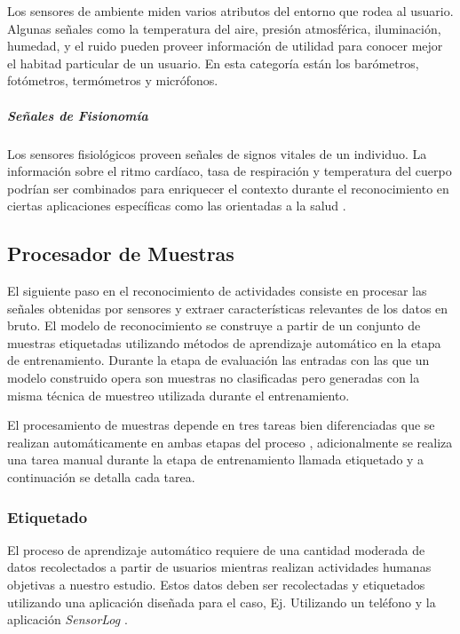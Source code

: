 Los sensores de ambiente miden varios atributos del entorno que rodea
al usuario. Algunas señales como la temperatura del aire, presión
atmosférica, iluminación, humedad, y el ruido pueden proveer información
de utilidad para conocer mejor el habitad particular de un usuario.
En esta categoría están los barómetros, fotómetros, termómetros y
micrófonos.

\subparagraph{Señales de Fisionomía}

Los sensores fisiológicos proveen señales de signos vitales de un
individuo. La información sobre el ritmo cardíaco, tasa de respiración
y temperatura del cuerpo podrían ser combinados para enriquecer el
contexto durante el reconocimiento en ciertas aplicaciones específicas
como las orientadas a la salud \cite{LaraLabrador2013}.

\subsection{Procesador de Muestras}

\label{sec44:proceso-se=0000F1ales}El siguiente paso en el reconocimiento
de actividades consiste en procesar las señales obtenidas por sensores
y extraer características relevantes de los datos en bruto. El modelo
de reconocimiento se construye a partir de un conjunto de muestras
etiquetadas utilizando métodos de aprendizaje automático en la etapa
de entrenamiento. Durante la etapa de evaluación las entradas con
las que un modelo construido opera son muestras no clasificadas pero
generadas con la misma técnica de muestreo utilizada durante el entrenamiento.

El procesamiento de muestras depende en tres tareas bien diferenciadas
que se realizan automáticamente en ambas etapas del proceso ,
adicionalmente se realiza una tarea manual durante la etapa de entrenamiento
llamada etiquetado y a continuación se detalla cada tarea.

\subsubsection{Etiquetado}

\label{ssec44:labeling}El proceso de aprendizaje automático requiere
de una cantidad moderada de datos recolectados a partir de usuarios
mientras realizan actividades humanas objetivas a nuestro estudio.
Estos datos deben ser recolectadas y etiquetados utilizando una aplicación
diseñada para el caso, Ej. Utilizando un teléfono 
y la aplicación \emph{SensorLog} \cite{Alan2014s}. 

